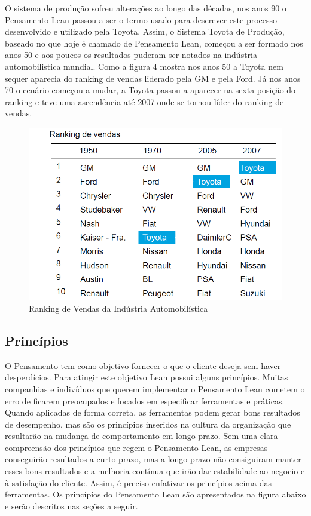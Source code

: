 O sistema de produção sofreu alterações ao longo das décadas, nos anos 90 o Pensamento Lean passou a ser o termo usado para descrever este processo desenvolvido e utilizado pela Toyota. Assim, o Sistema Toyota de Produção, baseado no que hoje é chamado de Pensamento Lean, começou a ser formado nos anos 50 e aos poucos os resultados puderam ser notados na indústria automobilistica mundial. Como a figura 4 mostra nos anos 50 a Toyota nem sequer aparecia do ranking de vendas liderado pela GM e pela Ford. Já nos anos 70 o cenário começou a mudar, a Toyota passou a aparecer na sexta posição do ranking e teve uma ascendência até 2007 onde se tornou líder do ranking de vendas.

\begin{figure}[h]
		\centering
		\label{fig01}
			\includegraphics[scale=0.5]{figuras/ranking.png}
		\caption{Ranking de Vendas da Indústria Automobilística  \cite{ranking}}
\end{figure}

\subsection[Princípios]{Princípios}

O Pensamento tem como objetivo fornecer o que o cliente deseja sem haver desperdícios. Para atingir este objetivo Lean possui alguns princípios. Muitas companhias e indivíduos que querem implementar o Pensamento Lean cometem o erro de ficarem preocupados e focados em especificar ferramentas e práticas. Quando aplicadas de forma correta, as ferramentas podem gerar bons resultados de desempenho, mas são os princípios inseridos na cultura da organização que resultarão na mudança de comportamento em longo prazo. Sem uma clara compreensão dos princípios que regem o Pensamento Lean, as empresas conseguirão resultados a curto prazo, mas a longo prazo não consiguiram manter esses bons resultados e a melhoria contínua que irão dar estabilidade ao negocio e à satisfação do cliente. Assim, é preciso enfativar os princípios acima das ferramentas. Os princípios do Pensamento Lean são apresentados na figura abaixo e serão descritos nas seções a seguir.

